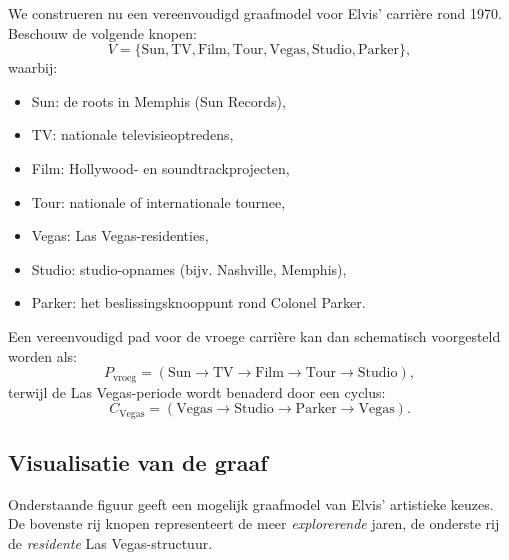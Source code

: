 \documentclass{book}
\begin{document}
	We construeren nu een vereenvoudigd graafmodel voor Elvis' carri\`ere rond 1970. Beschouw de volgende knopen:
	\[
	V = \{\text{Sun}, \text{TV}, \text{Film}, \text{Tour}, \text{Vegas}, \text{Studio}, \text{Parker}\},
	\]
	waarbij:
	\begin{itemize}
		\item Sun: de roots in Memphis (Sun Records),
		\item TV: nationale televisieoptredens,
		\item Film: Hollywood- en soundtrackprojecten,
		\item Tour: nationale of internationale tournee,
		\item Vegas: Las Vegas-residenties,
		\item Studio: studio-opnames (bijv. Nashville, Memphis),
		\item Parker: het beslissingsknooppunt rond Colonel Parker.
	\end{itemize}
	
	Een vereenvoudigd pad voor de vroege carri\`ere kan dan schematisch voorgesteld worden als:
	\[
	P_{\text{vroeg}} = (\text{Sun} \to \text{TV} \to \text{Film} \to \text{Tour} \to \text{Studio}),
	\]
	terwijl de Las Vegas-periode wordt benaderd door een cyclus:
	\[
	C_{\text{Vegas}} = (\text{Vegas} \to \text{Studio} \to \text{Parker} \to \text{Vegas}).
	\]
	
	\subsection{Visualisatie van de graaf}
	
	Onderstaande figuur geeft een mogelijk graafmodel van Elvis' artistieke keuzes. De bovenste rij knopen representeert de meer \emph{explorerende} jaren, de onderste rij de \emph{residente} Las Vegas-structuur.
	
\end{document}
